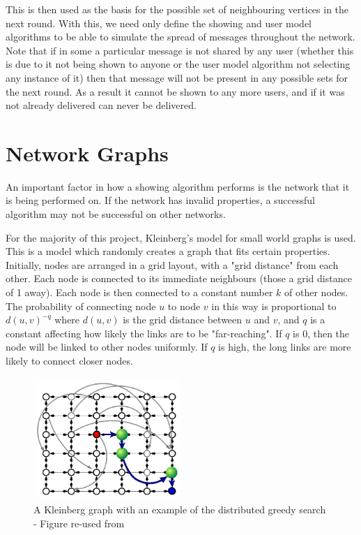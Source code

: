 \documentclass[bsc,frontabs,twoside,singlespacing,parskip,deptreport]{infthesis}     %
\begin{document}
This is then used as the basis for the possible set of neighbouring vertices in the next round. With this, we need only define the showing and user model algorithms to be able to simulate the spread of messages throughout the network. Note that if in some a particular message is not shared by any user (whether this is due to it not being shown to anyone or the user model algorithm not selecting any instance of it) then that message will not be present in any possible sets for the next round. As a result it cannot be shown to any more users, and if it was not already delivered can never be delivered.

\section{Network Graphs} \label{sec:graph_def}
An important factor in how a showing algorithm performs is the network that it is being performed on. If the network has invalid properties, a successful algorithm may not be successful on other networks.

For the majority of this project, Kleinberg's model for small world graphs is used\cite{Kleinberg00}. This is a model which randomly creates a graph that fits certain properties. Initially, nodes are arranged in a grid layout, with a "grid distance" from each other. Each node is connected to its immediate neighbours (those a grid distance of 1 away). Each node is then connected to a constant number $k$ of other nodes. The probability of connecting node $u$ to node $v$ in this way is proportional to $d(u, v)^{-q}$ where $d(u, v)$ is the grid distance between $u$ and $v$, and $q$ is a constant affecting how likely the links are to be "far-reaching". If $q$ is 0, then the node will be linked to other nodes uniformly. If $q$ is high, the long links are more likely to connect closer nodes.

\begin{figure}[ht]
  \centering
    \includegraphics[width=0.5\textwidth]{Schabanel11_Kleinbergs_Network}
  \caption{A Kleinberg graph with an example of the distributed greedy search - Figure re-used from \cite{Schabanel11}}
\end{figure}
\end{document}
